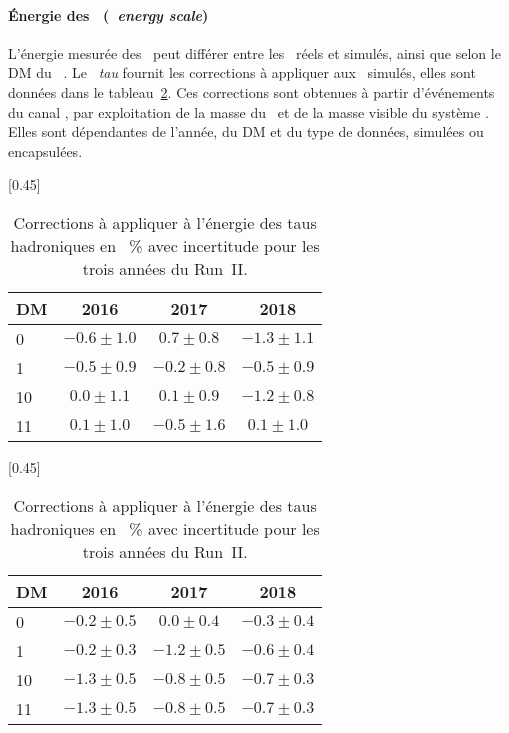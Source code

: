 \paragraph{Énergie des \tauh\ (\emph{\tauh\ energy scale})}
L'énergie mesurée des \tauh\ peut différer entre les \tauh\ réels et simulés, ainsi que selon le DM du \tauh~\cite{TauPOG}.
Le \POG\ \emph{tau} fournit les corrections à appliquer aux \tauh\ simulés, elles sont données dans le tableau~\ref{tab-chapter-CMS-section-taus-corrections-tauES}.
Ces corrections sont obtenues à partir d'événements du canal \mu\tauh, par exploitation de la masse du \tauh\ et de la masse visible du système \mu\tauh.
Elles sont dépendantes de l'année, du DM et du type de données, simulées ou encapsulées.
\begin{table}[h]
\centering
{}[0.45\textwidth]
{\begin{tabular}{lccc}
\toprule
DM & 2016 & 2017 & 2018\\
\midrule
0 & $\num{-0.6}\pm\num{1.0}$ & $\num{0.7}\pm\num{0.8}$ & $\num{-1.3}\pm\num{1.1}$ \\
1 & $\num{-0.5}\pm\num{0.9}$ & $\num{-0.2}\pm\num{0.8}$ & $\num{-0.5}\pm\num{0.9}$ \\
10 & $\num{0.0}\pm\num{1.1}$ & $\num{0.1}\pm\num{0.9}$ & $\num{-1.2}\pm\num{0.8}$ \\
11 & $\num{0.1}\pm\num{1.0}$ & $\num{-0.5}\pm\num{1.6}$ & $\num{0.1}\pm\num{1.0}$ \\
\bottomrule
\end{tabular}}
\qquad
{}[0.45\textwidth]
{\begin{tabular}{lccc}
\toprule
DM & 2016 & 2017 & 2018\\
\midrule
0 & $\num{-0.2}\pm\num{0.5}$ & $\num{0.0}\pm\num{0.4}$ & $\num{-0.3}\pm\num{0.4}$ \\
1 & $\num{-0.2}\pm\num{0.3}$ & $\num{-1.2}\pm\num{0.5}$ & $\num{-0.6}\pm\num{0.4}$ \\
10 & $\num{-1.3}\pm\num{0.5}$ & $\num{-0.8}\pm\num{0.5}$ & $\num{-0.7}\pm\num{0.3}$ \\
11 & $\num{-1.3}\pm\num{0.5}$ & $\num{-0.8}\pm\num{0.5}$ & $\num{-0.7}\pm\num{0.3}$ \\
\bottomrule
\end{tabular}}
\caption[Corrections à l'énergie des taus hadroniques.]{Corrections à appliquer à l'énergie des taus hadroniques en \SI{}{\%} avec incertitude pour les trois années du Run~II.}
\label{tab-chapter-CMS-section-taus-corrections-tauES}
\end{table}
